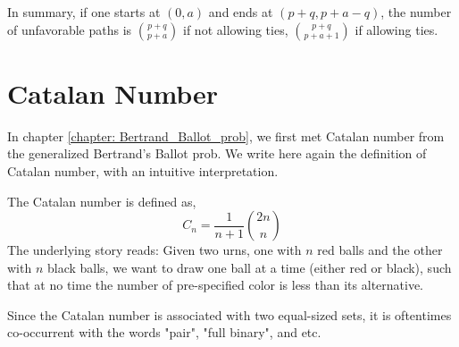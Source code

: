 In summary, if one starts at $(0,a)$ and ends at $(p+q,p+a-q)$, the number of unfavorable paths is $p+q \choose p+a$ if not allowing ties, $p+q \choose p+a+1$ if allowing ties.


\section{Catalan Number}
In chapter \ref{chapter: Bertrand_Ballot_prob}, we first met Catalan number from the generalized Bertrand's Ballot prob. We write here again the definition of Catalan number, with an intuitive interpretation.

The Catalan number is defined as,
\begin{equation}
	C_n = \frac{1}{n+1} {2n \choose n}
\end{equation}
The underlying story reads: Given two urns, one with $n$ red balls and the other with $n$ black balls, we want to draw one ball at a time (either red or black), such that at no time the number of pre-specified color is less than its alternative.

Since the Catalan number is associated with two equal-sized sets, it is oftentimes co-occurrent  with the words "pair", "full binary", and etc. 